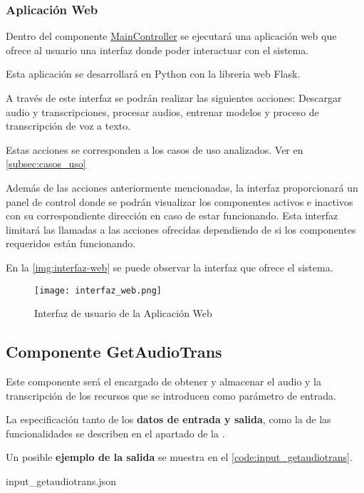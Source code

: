 \documentclass[../main.tex]{subfiles}
\begin{document}
\subsubsection{Aplicación Web}\label{subsubsec:aplicacionweb}
Dentro del componente \hyperref[par:maincontroller]{MainController} se ejecutará una aplicación web que ofrece al usuario una interfaz donde poder interactuar con el sistema.

Esta aplicación se desarrollará en Python con la libreria web Flask.

A través de este interfaz se podrán realizar las siguientes acciones: Descargar audio y transcripciones, procesar audios, entrenar modelos y proceso de transcripción de voz a texto.

Estas acciones se corresponden a los casos de uso analizados. Ver en \autoref{subsec:casos_uso}

Además de las acciones anteriormente mencionadas, la interfaz proporcionará un panel de control donde se podrán visualizar los componentes activos e inactivos con su correspondiente dirección en caso de estar funcionando. Esta interfaz limitará las llamadas a las acciones ofrecidas dependiendo de si los componentes requeridos están funcionando.

En la \autoref{img:interfaz-web} se puede observar la interfaz que ofrece el sistema.

\begin{figure}[H]
     \centering
     \texttt{[image: interfaz\_web.png]}
     \caption{Interfaz de usuario de la Aplicación Web}
     \label{img:interfaz-web}
 \end{figure}

\subsection{Componente GetAudioTrans}\label{subsec:impl_getaudiotrans}
Este componente será el encargado de obtener y almacenar el audio y la transcripción de los recursos que se introducen como parámetro de entrada.

La especificación tanto de los \textbf{datos de entrada y salida}, como la de las funcionalidades se describen en el apartado  de la .

Un posible \textbf{ejemplo de la salida} se muestra en el \autoref{code:input_getaudiotrans}.

                {input_getaudiotrans.json}
\end{document}
